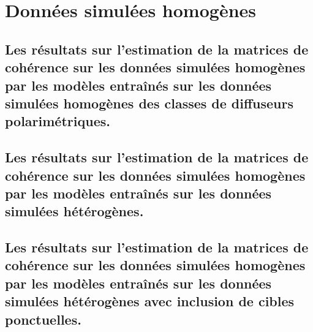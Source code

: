 \chapter{Données simulées homogènes}



\section{Les résultats sur l'estimation de la matrices de cohérence sur les données simulées homogènes par les modèles entraînés sur les données simulées homogènes des classes de diffuseurs polarimétriques.}
\label{annex-a:homogeneous_homogeneous_t3_results=0"}


\section{Les résultats sur l'estimation de la matrices de cohérence sur les données simulées homogènes par les modèles entraînés sur les données simulées hétérogènes.}
\label{annex-a:homogeneous_random_texture_t3_results=0"}


\section{Les résultats sur l'estimation de la matrices de cohérence sur les données simulées homogènes par les modèles entraînés sur les données simulées hétérogènes avec inclusion de cibles ponctuelles.}
\label{annex-a:homogeneous_random_texture_with_pts_t3_results=0"}


